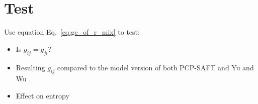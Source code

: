\documentclass[12pt, letterpaper]{article}
\begin{document}
\section{Test}
Use equation Eq.~\ref{eq:gc_of_r_mix} to test:
\begin{itemize}
\item Is $g_{ij} = g_{ji}$?
\item Resulting $g_{ij}$ compared to the model version of both
  PCP-SAFT \cite{sauer2017} and Yu and Wu \cite{yu2002}.
\item Effect on entropy
\end{itemize}
\clearpage


\end{document}
